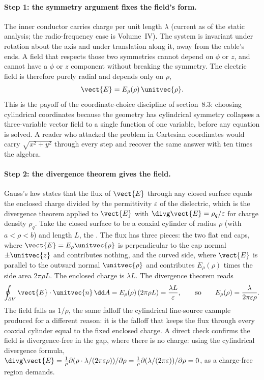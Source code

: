 \paragraph{Step 1: the symmetry argument fixes the field's form.}
The inner conductor carries charge per unit length $\lambda$ (current
as of the static analysis; the radio-frequency case is Volume~IV). The
system is invariant under rotation about the axis and under translation
along it, away from the cable's ends. A field that respects those two
symmetries cannot depend on $\phi$ or $z$, and cannot have a $\phi$ or
$z$ component without breaking the symmetry. The electric field is
therefore purely radial and depends only on $\rho$,
\[
\vect{E} = E_{\rho}(\rho)\,\unitvec{\rho}.
\]
This is the payoff of the coordinate-choice discipline of section~8.3:
choosing cylindrical coordinates because the geometry has cylindrical
symmetry collapses a three-variable vector field to a single function
of one variable, before any equation is solved. A reader who attacked
the problem in Cartesian coordinates would carry $\sqrt{x^{2} + y^{2}}$
through every step and recover the same answer with ten times the
algebra.

\paragraph{Step 2: the divergence theorem gives the field.} Gauss's
law states that the flux of $\vect{E}$ through any closed surface
equals the enclosed charge divided by the permittivity
$\varepsilon$ of the dielectric, which is the divergence theorem
applied to $\vect{E}$ with $\divg\vect{E} = \rho_{q}/\varepsilon$ for
charge density $\rho_{q}$. Take the closed surface to be a coaxial
cylinder of radius $\rho$ (with $a < \rho < b$) and length $L$, the
. The flux has three pieces: the two flat
end caps, where $\vect{E} = E_{\rho}\unitvec{\rho}$ is perpendicular to
the cap normal $\pm\unitvec{z}$ and contributes nothing, and the
curved side, where $\vect{E}$ is parallel to the outward normal
$\unitvec{\rho}$ and contributes $E_{\rho}(\rho)$ times the side area
$2\pi\rho L$. The enclosed charge is $\lambda L$. The divergence
theorem reads
\[
\oint_{\partial V}\vect{E}\cdot\unitvec{n}\,\dd A =
E_{\rho}(\rho)\,(2\pi\rho L) = \frac{\lambda L}{\varepsilon},
\qquad\text{so}\qquad
E_{\rho}(\rho) = \frac{\lambda}{2\pi\varepsilon\rho}.
\]
The field falls as $1/\rho$, the same falloff the cylindrical
line-source example produced for a different reason: it is the falloff
that keeps the flux through every coaxial cylinder equal to the fixed
enclosed charge. A direct check confirms the field is divergence-free
in the gap, where there is no charge: using the cylindrical divergence
formula, $\divg\vect{E} = \frac{1}{\rho}\partial(\rho\cdot\lambda/
(2\pi\varepsilon\rho))/\partial\rho = \frac{1}{\rho}\partial(\lambda/
(2\pi\varepsilon))/\partial\rho = 0$, as a charge-free region demands.

